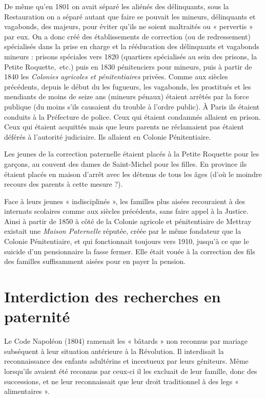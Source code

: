  De même qu'en 1801 on avait séparé les aliénés des délinquants, sous la Restauration on a séparé autant que faire se pouvait les mineurs, délinquants et vagabonds, des majeurs, pour éviter qu'ils ne soient maltraités ou « pervertis » par eux. On a donc créé des établissements de correction (ou de redressement) spécialisés dans la prise en charge et la rééducation des délinquants et vagabonds mineurs : prisons spéciales vers 1820 (quartiers spécialisés au sein des prisons, la Petite Roquette,~etc.) puis en 1830 pénitenciers pour mineurs, puis à partir de 1840 les \emph{Colonies agricoles et pénitentiaires} privées. Comme aux siècles précédents, depuis le début du  les fugueurs, les vagabonds, les prostitués et les mendiants de moins de seize ans (mineurs pénaux) étaient arrêtés par la force publique (du moins s'ils causaient du trouble à l'ordre public). À Paris ils étaient conduits à la Préfecture de police. Ceux qui étaient condamnés allaient en prison. Ceux qui étaient acquittés mais que leurs parents ne réclamaient pas étaient déférés à l'autorité judiciaire. Ils allaient en Colonie Pénitentiaire.

 Les jeunes de la correction paternelle étaient placés à la Petite Roquette pour les garçons, au couvent des dames de Saint-Michel pour les filles. En province ils étaient placés en maison d'arrêt avec les détenus de tous les âges (d'où le moindre recours des parents à cette mesure ?). 

 Face à leurs jeunes « indisciplinés », les familles plus aisées recouraient à des internats scolaires comme aux siècles précédents, sans faire appel à la Justice. Ainsi à partir de 1850 à côté de la Colonie agricole et pénitentiaire de Mettray existait une \emph{Maison Paternelle} réputée, créée par le même fondateur que la Colonie Pénitentiaire, et qui fonctionnait toujours vers 1910, jusqu'à ce que le suicide d'un pensionnaire la fasse fermer. Elle était vouée à la correction des fils des familles suffisamment aisées pour en payer la pension.

\section{Interdiction des recherches en paternité}

 Le Code Napoléon (1804) ramenait les « bâtards » non reconnus par mariage subséquent à leur situation antérieure à la Révolution. Il interdisait la reconnaissance des enfants adultérins et incestueux par leurs géniteurs. Même lorsqu'ils avaient été reconnus par ceux-ci il les excluait de leur famille, donc des successions, et ne leur reconnaissait que leur droit traditionnel à des legs « alimentaires ». 

